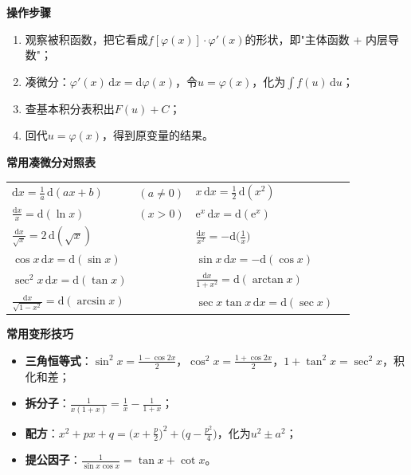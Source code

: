 
\noindent\textbf{操作步骤}
\begin{enumerate}
  \item 观察被积函数，把它看成$f[\varphi(x)]\cdot\varphi'(x)$的形状，即"主体函数 + 内层导数"；
  \item 凑微分：$\varphi'(x)\,\mathrm{d}x=\mathrm{d}\varphi(x)$，令$u=\varphi(x)$，化为$\int f(u)\,\mathrm{d}u$；
  \item 查基本积分表积出$F(u)+C$；
  \item 回代$u=\varphi(x)$，得到原变量的结果。
\end{enumerate}

\noindent\textbf{常用凑微分对照表}
\begin{center}
\begin{tabular}{@{}ll@{\qquad}ll@{}}
\toprule
$\mathrm{d}x=\frac{1}{a}\,\mathrm{d}(ax+b)$ & $(a\neq0)$ &
$x\,\mathrm{d}x=\frac{1}{2}\,\mathrm{d}(x^2)$ & \\[4pt]
$\frac{\mathrm{d}x}{x}=\mathrm{d}(\ln x)$ & $(x>0)$ &
$\mathrm{e}^x\,\mathrm{d}x=\mathrm{d}(\mathrm{e}^x)$ & \\[4pt]
$\frac{\mathrm{d}x}{\sqrt{x}}=2\,\mathrm{d}(\sqrt{x})$ & &
$\frac{\mathrm{d}x}{x^2}=-\mathrm{d}\bigl(\frac{1}{x}\bigr)$ & \\[4pt]
$\cos x\,\mathrm{d}x=\mathrm{d}(\sin x)$ & &
$\sin x\,\mathrm{d}x=-\mathrm{d}(\cos x)$ & \\[4pt]
$\sec^2x\,\mathrm{d}x=\mathrm{d}(\tan x)$ & &
$\frac{\mathrm{d}x}{1+x^2}=\mathrm{d}(\arctan x)$ & \\[4pt]
$\frac{\mathrm{d}x}{\sqrt{1-x^2}}=\mathrm{d}(\arcsin x)$ & &
$\sec x\tan x\,\mathrm{d}x=\mathrm{d}(\sec x)$ & \\
\bottomrule
\end{tabular}
\end{center}

\noindent\textbf{常用变形技巧}
\begin{itemize}
  \item \textbf{三角恒等式}：$\sin^2x=\frac{1-\cos2x}{2}$，$\cos^2x=\frac{1+\cos2x}{2}$，$1+\tan^2x=\sec^2x$，积化和差；
  \item \textbf{拆分子}：$\frac{1}{x(1+x)}=\frac{1}{x}-\frac{1}{1+x}$；
  \item \textbf{配方}：$x^2+px+q=\bigl(x+\frac{p}{2}\bigr)^2+\bigl(q-\frac{p^2}{4}\bigr)$，化为$u^2\pm a^2$；
  \item \textbf{提公因子}：$\frac{1}{\sin x\cos x}=\tan x+\cot x$。
\end{itemize}

